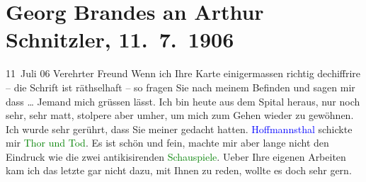 

               \section[Georg Brandes an Arthur Schnitzler, 11. 7. 1906]{ Georg Brandes an Arthur Schnitzler, 11. 7. 1906}\nopagebreak{}\rehead{ }\normalsize\beginnumbering{} \toendnotes[C]{\smallbreak\pagebreak[2]} 
\toendnotes[C]{\smallbreak}\pstart
           \raggedleft{}{\pb}11 Juli 06\pend
           \pstart{}Verehrter Freund\pend\pstart
           Wenn ich Ihre Karte einigermassen richtig dechiffrire – die Schrift ist
                    räthselhaft – so fragen Sie nach meinem Befinden und sagen mir dass {\dots} Jemand mich grüssen lässt.\pend
           \pstart
           Ich bin heute aus dem Spital heraus, nur noch sehr, sehr matt, stolpere aber
                    umher, um mich zum Gehen wieder zu gewöhnen.\pend
           \pstart
           Ich wurde sehr gerührt, dass {\pb}Sie meiner gedacht hatten. \textcolor{blue}{Hoffmannsthal}{}\ledrightnote{\textcolor{blue}{Hugo von Hofmannsthal}}
               schickte mir \textcolor{green}{Thor und Tod}{}\ledrightnote{\textcolor{green}{Der Thor und der Tod}}. Es ist schön und fein, machte
                    mir aber lange nicht den Eindruck wie die zwei antikisirenden \textcolor{green}{Schauspiele}{}.\pend
           \pstart
           Ueber Ihre eigenen Arbeiten kam ich das letzte \label{K_L01609_1v}\label{K_L01609_1h} gar nicht dazu, mit
                    Ihnen zu reden, wollte es doch sehr gern.\pend
